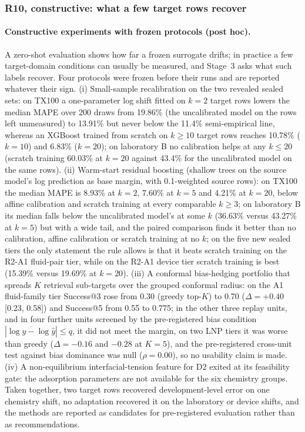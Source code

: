 \documentclass[11pt,a4paper]{article}
\newcommand{\tox}{TX100}
\begin{document}
\subsubsection{R10, constructive: what a few target rows recover}
\label{sec:r10constructive}
\paragraph{Constructive experiments with frozen protocols (post hoc).} A
zero-shot evaluation shows how far a frozen surrogate drifts; in
practice a few target-domain conditions can usually be measured, and Stage~3
asks what such labels recover. Four protocols were frozen before their runs
and are reported whatever their sign. (i) Small-sample recalibration on the two revealed sealed sets:
on \tox{} a one-parameter log shift fitted on $k=2$ target rows lowers the
median MAPE over 200 draws from 19.86\% (the uncalibrated model on the rows left
unmeasured) to 13.91\% but never below the 11.4\%
semi-empirical line, whereas an XGBoost trained from scratch on $k\ge 10$
target rows reaches 10.78\% ($k=10$) and 6.83\% ($k=20$); on laboratory B no
calibration helps at any $k\le 20$ (scratch training 60.03\% at $k=20$
against 43.4\% for the uncalibrated model on the same rows). (ii) Warm-start residual boosting (shallow
trees on the source model's log prediction as base margin, with
0.1-weighted source rows): on \tox{} the median MAPE is 8.93\% at $k=2$,
7.60\% at $k=5$ and 4.21\% at $k=20$, below affine calibration and scratch
training at every comparable $k\ge 3$; on laboratory B its median falls below the
uncalibrated model's at some $k$ (36.63\% versus 43.27\% at $k=5$) but with a
wide tail, and the paired comparison finds it better than no calibration,
affine calibration or scratch training at no $k$; on
the five new sealed tiers the only statement the rule allows is that it beats
scratch training on the R2-A1 fluid-pair tier, while on the R2-A1 device tier
scratch training is best (15.39\% versus 19.69\% at $k=20$). (iii) A
conformal bias-hedging portfolio that spreads $K$ retrieval sub-targets over
the grouped conformal radius: on the A1 fluid-family tier Success@3 rose from
0.30 (greedy top-$K$) to 0.70 ($\Delta=+0.40$ [0.23, 0.58]) and Success@5
from 0.55 to 0.775; in the other three replay units, and in four further
units screened by the pre-registered bias condition
$|\overline{\log y-\log\hat y}|\le q$, it did not meet the margin, on two LNP
tiers it was worse than greedy ($\Delta=-0.16$ and $-0.28$ at $K=5$), and the
pre-registered cross-unit test against bias dominance was null
($\rho=0.00$), so no usability claim is made. (iv) A non-equilibrium
interfacial-tension feature for D2 exited at its feasibility gate: the
adsorption parameters are not available for the six chemistry groups. Taken
together, two target rows recovered development-level error on one chemistry
shift, no adaptation recovered it on the laboratory or device shifts, and the
methods are reported as candidates for pre-registered evaluation rather than
as recommendations.
\end{document}
